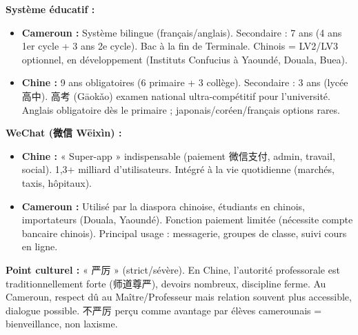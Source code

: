 \documentclass[11pt]{article}
\newcommand{\cle}[1]{{\popxbold\color{popdark}#1}}
\begin{document}
\begin{savaistu}
\textbf{Système éducatif :}
\begin{itemize}
    \item \textbf{Cameroun :} Système bilingue (français/anglais). Secondaire : 7 ans (4 ans 1er cycle + 3 ans 2e cycle). Bac à la fin de Terminale. Chinois = LV2/LV3 optionnel, en développement (Instituts Confucius à Yaoundé, Douala, Buea).
    \item \textbf{Chine :} 9 ans obligatoires (6 primaire + 3 collège). Secondaire : 3 ans (lycée \cle{高中}). \cle{高考} (Gāokǎo) examen national ultra-compétitif pour l'université. Anglais obligatoire dès le primaire ; japonais/coréen/français options rares.
\end{itemize}

\textbf{WeChat (\cle{微信 Wēixìn}) :}
\begin{itemize}
    \item \textbf{Chine :} « Super-app » indispensable (paiement \cle{微信支付}, admin, travail, social). 1,3+ milliard d'utilisateurs. Intégré à la vie quotidienne (marchés, taxis, hôpitaux).
    \item \textbf{Cameroun :} Utilisé par la diaspora chinoise, étudiants en chinois, importateurs (Douala, Yaoundé). Fonction paiement limitée (nécessite compte bancaire chinois). Principal usage : messagerie, groupes de classe, suivi cours en ligne.
\end{itemize}

\textbf{Point culturel :} « \cle{严厉} » (strict/sévère). En Chine, l'autorité professorale est traditionnellement forte (\cle{师道尊严}), devoirs nombreux, discipline ferme. Au Cameroun, respect dû au \cle{Maître/Professeur} mais relation souvent plus accessible, dialogue possible. \cle{不严厉} perçu comme avantage par élèves camerounais = bienveillance, non laxisme.
\end{savaistu}
\end{document}
